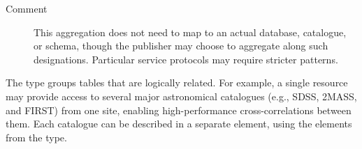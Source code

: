 \documentclass[11pt,a4paper]{ivoa}
\begin{document}
\begin{generated}
\begin{bigdescription}
\begin{description}
\item[Comment]
                This aggregation does not need to map to an
                actual database, catalogue, or schema, though the
                publisher may choose to aggregate along such
                designations.  Particular service protocols may
                require stricter patterns.


\end{description}


\end{bigdescription}\endgroup

\endgroup
\end{generated}



The  type groups
tables that are logically related.
For example, a single
resource may provide access to several major astronomical catalogues
(e.g., SDSS, 2MASS, and FIRST) from one site, enabling high-performance
cross-correlations between them.  Each catalogue can be described in a
separate  element, using the elements from
the  type.
\end{document}
